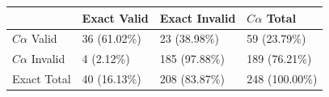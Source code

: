 \begin{tabular}{llll}
\toprule
 & Exact Valid & Exact Invalid & $C\alpha$ Total \\
\midrule
$C\alpha$ Valid & 36 (61.02\%) & 23 (38.98\%) & 59 (23.79\%) \\
$C\alpha$ Invalid & 4 (2.12\%) & 185 (97.88\%) & 189 (76.21\%) \\
Exact Total & 40 (16.13\%) & 208 (83.87\%) & 248 (100.00\%) \\
\bottomrule
\end{tabular}
